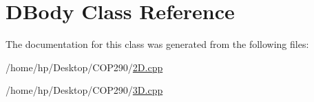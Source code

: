 \hypertarget{class_d_body}{}\section{D\+Body Class Reference}
\label{class_d_body}


The documentation for this class was generated from the following files\+:\begin{DoxyCompactItemize}
\item 
/home/hp/\+Desktop/\+C\+O\+P290/\hyperlink{2_d_8cpp}{2\+D.\+cpp}\item 
/home/hp/\+Desktop/\+C\+O\+P290/\hyperlink{3_d_8cpp}{3\+D.\+cpp}\end{DoxyCompactItemize}
